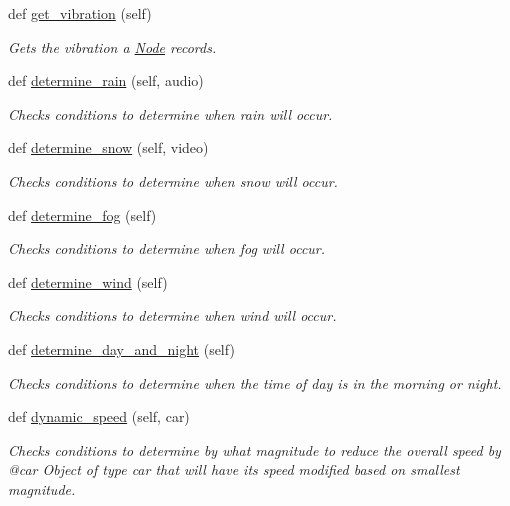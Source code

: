 \begin{DoxyCompactItemize}
def \mbox{\hyperlink{classcar_1_1_node_ae0668fd6f1f82198ed72bf23dc8de2c5}{get\+\_\+vibration}} (self)
\begin{DoxyCompactList}\small\item\em Gets the vibration a \mbox{\hyperlink{classcar_1_1_node}{Node}} records. \end{DoxyCompactList}\item 
def \mbox{\hyperlink{classcar_1_1_node_a0037a6296a1a5c756eca31be64c110a0}{determine\+\_\+rain}} (self, audio)
\begin{DoxyCompactList}\small\item\em Checks conditions to determine when rain will occur. \end{DoxyCompactList}\item 
def \mbox{\hyperlink{classcar_1_1_node_ae919d73474fc9699640c236a46e8de97}{determine\+\_\+snow}} (self, video)
\begin{DoxyCompactList}\small\item\em Checks conditions to determine when snow will occur. \end{DoxyCompactList}\item 
def \mbox{\hyperlink{classcar_1_1_node_a2cbd7cc6d3a4e546aef0ac214124504a}{determine\+\_\+fog}} (self)
\begin{DoxyCompactList}\small\item\em Checks conditions to determine when fog will occur. \end{DoxyCompactList}\item 
def \mbox{\hyperlink{classcar_1_1_node_ad7c3d784fff597ed642f546a0bb38398}{determine\+\_\+wind}} (self)
\begin{DoxyCompactList}\small\item\em Checks conditions to determine when wind will occur. \end{DoxyCompactList}\item 
def \mbox{\hyperlink{classcar_1_1_node_aa1967966377bccbfc18de048cd843b28}{determine\+\_\+day\+\_\+and\+\_\+night}} (self)
\begin{DoxyCompactList}\small\item\em Checks conditions to determine when the time of day is in the morning or night. \end{DoxyCompactList}\item 
def \mbox{\hyperlink{classcar_1_1_node_a4245124715ae3b57e766b7bae55ecbf7}{dynamic\+\_\+speed}} (self, car)
\begin{DoxyCompactList}\small\item\em Checks conditions to determine by what magnitude to reduce the overall speed by @car Object of type car that will have its speed modified based on smallest magnitude. \end{DoxyCompactList}\end{DoxyCompactItemize}
